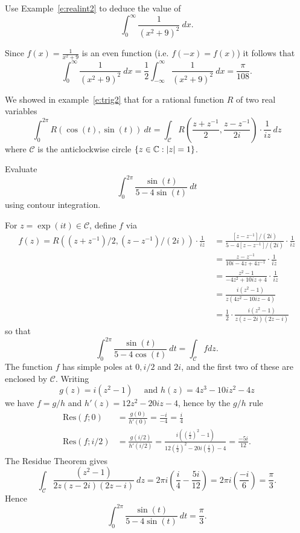 \begin{example}
Use Example~\ref{e:realint2} to deduce the value of
\[
\int_0^{\infty} \frac{1}{(x^2+9)^2}\ dx.
\]
\end{example}
\begin{solution}
Since $\displaystyle f(x) = \frac{1}{x^2+9}$ is an even function (i.e. $f(-x)=f(x)$) it follows that
\[
\int_0^{\infty} \frac{1}{(x^2+9)^2}\ dx  = \frac{1}{2} \int_{-\infty}^{\infty} \frac{1}{(x^2+9)^2}\ dx = \frac{\pi}{108}.
\]
\end{solution}


We showed in example~\ref{e:trig2} that for a rational function $R$ of two real variables
\[
\int_0^{2\pi} R ( \cos(t), \sin(t))\ dt = \int_{\mathcal{C}} R \left( \frac{z+z^{-1}}{2} , \frac{z-z^{-1}}{2i} \right) \cdot \frac{1}{iz}\ dz
\]
where $\mathcal{C}$ is the anticlockwise circle $\left\{z \in \mathbb{C}: \left| z \right|=1\right\}$.

\begin{example}
Evaluate
\[
\int_0^{2\pi} \frac{\sin (t)}{5-4\sin(t)}\ dt
\]
using contour integration.
\end{example}
\begin{solution}
For $z = \exp (it) \in \mathcal{C}$, define $f$ via 
\begin{align*}
f(z) = R \left( (z+z^{-1})/2,(z-z^{-1})/(2i) \right) \cdot \frac{1}{iz}\ & = \frac{[z-z^{-1}]/(2i)}{5-4[z-z^{-1}]/(2i)}\cdot \frac{1}{iz} \\
& = \frac{z-z^{-1}}{10i-4z+4z^{-1}} \cdot \frac{1}{iz} \\
& =  \frac{z^2-1}{-4z^2+10iz+4} \cdot \frac{1}{iz} \\
& =  \frac{i(z^2-1)}{z(4z^2-10iz-4)}\\
& = \frac{1}{2} \cdot \frac{i(z^2-1)}{z(z-2i)(2z-i)}
\end{align*}
so that
\[
\int_0^{2\pi} \frac{\sin (t)}{5-4\cos(t)}\ dt = \int_{\mathcal{C}}  f dz.
\]
The function $f$ has simple poles at $0, i/2$ and $2i$, and  the first two of these are enclosed by $\mathcal{C}$.  Writing
\[
g(z)=i(z^2-1) \quad \text{ and } h(z) = 4z^3-10iz^2-4z
\]
we have $f=g/h$ and $h'(z)=12z^2-20iz-4$, hence by the $g/h$ rule
\begin{align*}
\mathrm{Res} (f;0) & = \frac{g(0)}{h'(0)} = \frac{-i}{-4} = \frac{i}{4} \\
\mathrm{Res} (f;i/2) & = \frac{g(i/2)}{h'(i/2)} = \frac{i((\tfrac{i}{2})^2-1)}{12(\tfrac{i}{2})^2-20i(\tfrac{i}{2})-4} =\frac{-5i}{12}.
\end{align*}
The Residue Theorem gives 
\[
\int_{\mathcal{C}}  \frac{(z^2-1)}{2z(z-2i)(2z-i)}\ dz =  2 \pi i \left( \frac{i}{4} - \frac{5i}{12} \right) =2\pi i \left(\frac{-i}{6} \right) = \frac{\pi}{3}. 
\]
Hence
\[
\int_0^{2\pi} \frac{\sin (t)}{5-4\sin(t)}\ dt =\frac{\pi}{3}.
\]
\end{solution}








